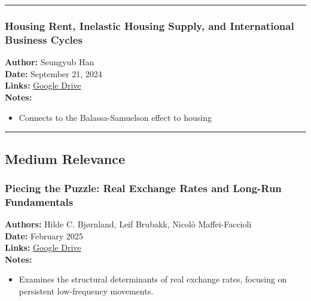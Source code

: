 \documentclass[
  11pt,
]{article}
\providecommand{\tightlist}{%
  \setlength{\itemsep}{0pt}\setlength{\parskip}{0pt}}
\begin{document}
\begin{center}\rule{0.5\linewidth}{0.5pt}\end{center}

\subsubsection{Housing Rent, Inelastic Housing Supply, and International
Business
Cycles}\label{housing-rent-inelastic-housing-supply-and-international-business-cycles}

\textbf{Author:} Seungyub Han\\
\textbf{Date:} September 21, 2024\\
\textbf{Links:}
\href{https://drive.google.com/file/d/1loPvpeqirt1pulEqajxQNMCGLeIFt_AS/view?usp=sharing}{Google
Drive}\\
\textbf{Notes:}

\begin{itemize}
\tightlist
\item
  Connects to the Balassa-Samuelson effect to housing
\end{itemize}

\begin{center}\rule{0.5\linewidth}{0.5pt}\end{center}

\subsection{Medium Relevance}\label{medium-relevance}

\subsubsection{Piecing the Puzzle: Real Exchange Rates and Long-Run
Fundamentals}\label{piecing-the-puzzle-real-exchange-rates-and-long-run-fundamentals}

\textbf{Authors:} Hilde C. Bjørnland, Leif Brubakk, Nicolò
Maffei-Faccioli\\
\textbf{Date:} February 2025\\
\textbf{Links:}
\href{https://drive.google.com/file/d/1r4zwdG1oeC5fSfW7nBtjWwDWBQFNNTmZ/view?usp=sharing}{Google
Drive}\\
\textbf{Notes:}

\begin{itemize}
\tightlist
\item
  Examines the structural determinants of real exchange rates, focusing
  on persistent low-frequency movements.
\end{itemize}
\end{document}
